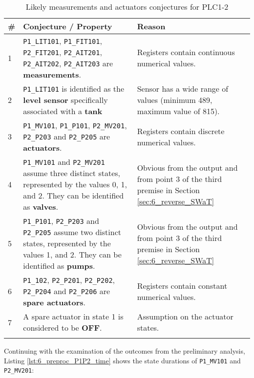 {
	\small
	\begin{longtable}[l]{p{} p{} p{}}
		\hline
		\textbf{\#} & \textbf{Conjecture / Property} & \textbf{Reason} \\
		\hline
		
		1 & \texttt{P1\_LIT101}, \texttt{P1\_FIT101}, \texttt{P2\_FIT201}, \texttt{P2\_AIT201}, \texttt{P2\_AIT202}, \texttt{P2\_AIT203} are \textbf{measurements}. & Registers contain continuous numerical values.\\
		\hline
		
		2 & \texttt{P1\_LIT101} is identified as the \textbf{level sensor} specifically associated with a \textbf{tank} & Sensor has a wide range of values (minimum 489, maximum value of 815).\\
		\hline
		
		3 & \texttt{P1\_MV101}, \texttt{P1\_P101}, \texttt{P2\_MV201}, \texttt{P2\_P203} and \texttt{P2\_P205} are \textbf{actuators}. & Registers contain discrete numerical values.\\
		\hline
		
		4 & \texttt{P1\_MV101} and \texttt{P2\_MV201} assume three distinct states, represented by the values 0, 1, and 2. They can be identified as \textbf{valves}.& Obvious from the output and from point 3 of the third premise in Section \ref{sec:6_reverse_SWaT}\\
		\hline
		
		5 & \texttt{P1\_P101}, \texttt{P2\_P203} and \texttt{P2\_P205} assume two distinct states, represented by the values 1, and 2. They can be identified as \textbf{pumps}. & Obvious from the output and from point 3 of the third premise in Section \ref{sec:6_reverse_SWaT}\\
		\hline
		
		6 & \texttt{P1\_102}, \texttt{P2\_P201}, \texttt{P2\_P202}, \texttt{P2\_P204} and \texttt{P2\_P206} are \textbf{spare actuators}. & Registers contain constant numerical values.\\
		\hline 
		
		7 & A spare actuator in state 1 is considered to be \textbf{OFF}. & Assumption on the actuator states.\\
		\hline
		
		\caption{Likely measurements and actuators conjectures for PLC1-2}
		\label{table:6_p1p2_actuators_1}
	\end{longtable}
}

\bigskip
Continuing with the examination of the outcomes from the preliminary analysis, Listing \ref{lst:6_preproc_P1P2_time} shows the state durations of \texttt{P1\_MV101} and \texttt{P2\_MV201}:

